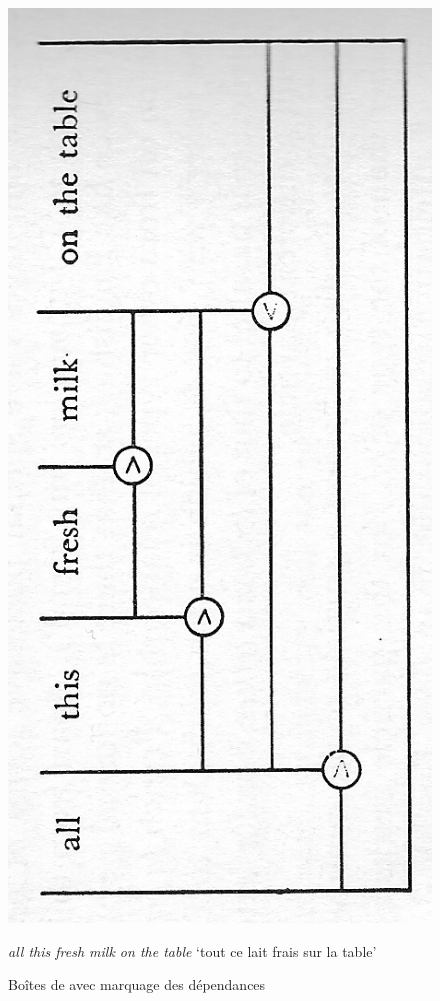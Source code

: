 {\begin{figure}
    \centering
    \includegraphics[width=\textwidth]{figures/vol1syntaxe2-img025.png}
    \caption{Boîtes de \citealt{hockett1958course} avec marquage des dépendances}
    \textit{all this fresh milk on the table} ‘tout ce lait frais sur la table’
    \label{fig:hockett2}
\end{figure}

}

